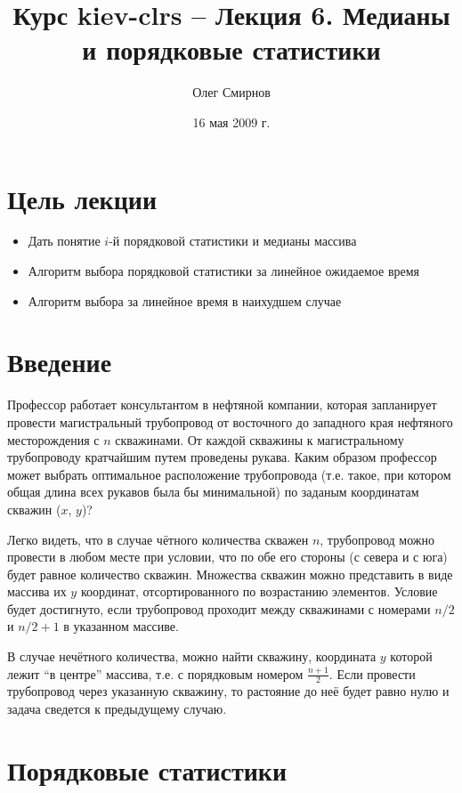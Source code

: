 \documentclass[11pt]{article}
\author{Олег Смирнов}
\title{Курс kiev-clrs -- Лекция 6. Медианы и порядковые статистики}
\date{16 мая 2009 г.}
\begin{document}
\maketitle
\tableofcontents

\newpage
\setlength{\parskip}{1ex plus 0.5ex minus 0.2ex}
\section{Цель лекции}
\begin{itemize}
\item Дать понятие $i$-й порядковой статистики и медианы массива
\item Алгоритм выбора порядковой статистики за линейное ожидаемое время
\item Алгоритм выбора за линейное время в наихудшем случае
\end{itemize}

\section{Введение}

Профессор работает консультантом в нефтяной компании, которая запланирует провести магистральный трубопровод от восточного до западного края нефтяного месторождения с $n$ скважинами. От каждой скважины к магистральному трубопроводу кратчайшим путем проведены рукава. Каким образом профессор может выбрать оптимальное расположение трубопровода (т.е. такое, при котором общая длина всех рукавов была бы минимальной) по заданым координатам скважин ($x$, $y$)?

Легко видеть, что в случае чётного количества скважен $n$, трубопровод можно провести в любом месте при условии, что по обе его стороны (с севера и с юга) будет равное количество скважин. Множества скважин можно представить в виде массива их $y$ координат, отсортированного по возрастанию элементов. Условие будет достигнуто, если трубопровод проходит между скважинами с номерами $n/2$ и $n/2+1$ в указанном массиве.

В случае нечётного количества, можно найти скважину, координата $y$ которой лежит ``в центре'' массива, т.е. с порядковым номером $\frac{n+1}{2}$. Если провести трубопровод через указанную скважину, то растояние до неё будет равно нулю и задача сведется к предыдущему случаю.

\section{Порядковые статистики}
\end{document}
